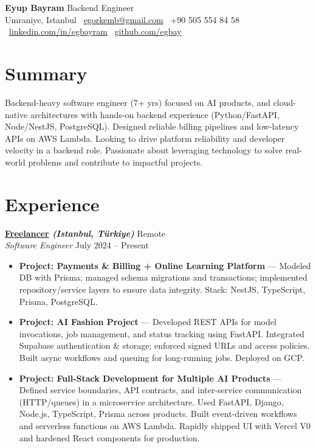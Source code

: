 \documentclass[10pt,a4paper]{extarticle}
\begin{document}
\begin{center}
  \begin{minipage}{\textwidth}
    \centering
    {\LARGE\textbf{Eyup Bayram}} \hspace{2pt} {\LARGE Backend Engineer}\\[8pt]
    Umraniye, Istanbul \textbullet\ 
    \href{mailto:egorkemb@gmail.com}{egorkemb@gmail.com} \textbullet\
    +90 505 554 84 58 \textbullet\
    \href{https://linkedin.com/in/egbayram}{linkedin.com/in/egbayram} \textbullet\
    \href{https://github.com/egbay}{github.com/egbay}
  \end{minipage}
\end{center}

\section{Summary}
Backend-heavy software engineer (7+ yrs) focused on AI products, and cloud-native architectures with hands-on backend experience (Python/FastAPI, Node/NestJS, PostgreSQL). Designed reliable billing pipelines and low-latency APIs on AWS Lambda. Looking to drive platform reliability and developer velocity in a backend role. Passionate about leveraging technology to solve real-world problems and contribute to impactful projects. 

\section{Experience}
\textbf{\href{https://linkedin.com/in/egbayram}{Freelancer} \textit{(Istanbul, Türkiye)}} \hfill Remote\\
\textit{Software Engineer} \hfill July 2024 -- Present
\begin{itemize}[leftmargin=*,noitemsep,topsep=0pt]
    \item \textbf{Project: Payments \& Billing + Online Learning Platform} --- Modeled DB with Prisma; managed schema migrations and transactions; implemented repository/service layers to ensure data integrity. Stack: NestJS, TypeScript, Prisma, PostgreSQL.
    \item \textbf{Project: AI Fashion Project} --- Developed REST APIs for model invocations, job management, and status tracking using FastAPI. Integrated Supabase authentication \& storage; enforced signed URLs and access policies. Built async workflows and queuing for long-running jobs. Deployed on GCP.
    \item \textbf{Project: Full-Stack Development for Multiple AI Products} --- Defined service boundaries, API contracts, and inter-service communication (HTTP/queues) in a microservice architecture. Used FastAPI, Django, Node.js, TypeScript, Prisma across products. Built event-driven workflows and serverless functions on AWS Lambda. Rapidly shipped UI with Vercel V0 and hardened React components for production.
\end{itemize}
\end{document}
